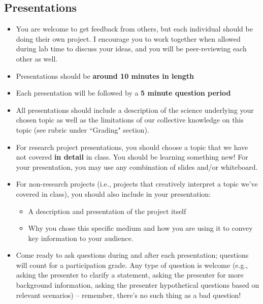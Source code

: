\documentclass[11pt]{article}
\begin{document}
\subsection*{Presentations}
\begin{itemize}[noitemsep]
    \item You are welcome to get feedback from others, but each individual should be doing their own project. I encourage you to work together when allowed during lab time to discuss your ideas, and you will be peer-reviewing each other as well. 
    \item Presentations should be  \textbf{around 10 minutes in length}
    \item Each presentation will be followed by a \textbf{5 minute question period}
    \item All presentations should include a description of the science underlying your chosen topic as well as the limitations of our collective knowledge on this topic (see rubric under ``Grading" section).
    \item For research project presentations, you should choose a topic that we have not covered \textbf{in detail} in class. You should be learning something new! For your presentation, you may use any combination of slides and/or whiteboard.
    \item For non-research projects (i.e., projects that creatively interpret a topic we've covered in class), you should also include in your presentation:
    \begin{itemize}
        \item A description and presentation of the project itself
        \item Why you chose this specific medium and how you are using it to convey key information to your audience.
    \end{itemize}
    \item Come ready to ask questions during and after each presentation; questions will count for a participation grade.  Any type of question is welcome (e.g., asking the presenter to clarify a statement, asking the presenter for more background information, asking the presenter hypothetical questions based on relevant scenarios) -- remember, there's no such thing as a bad question!
\end{itemize}
\end{document}
